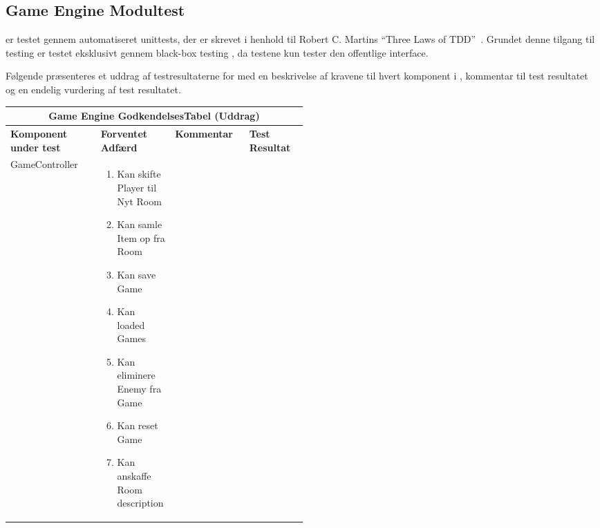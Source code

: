 \subsection{Game Engine Modultest}

\noindent \GE{} er testet gennem automatiseret unittests, der er skrevet i henhold til Robert C. Martins 
``Three Laws of TDD''\ \parencite[Side 122]{CleanCode}. Grundet denne tilgang til testing er \GE{}
testet eksklusivt gennem black-box testing \parencite{BlackBoxLecture}, da testene kun tester den 
offentlige interface.

Følgende præsenteres et uddrag af testresultaterne for \GE{} med en beskrivelse af kravene til hvert 
komponent i \GE{}, kommentar til test resultatet og en endelig vurdering af test resultatet.

\begin{center}
  \begin{longtable}{|l|p{0.25\linewidth}|p{0.25\linewidth}|l|}
    \hline
    \multicolumn{4}{|c|}{\textbf{Game Engine GodkendelsesTabel (Uddrag)}} \\ \hline
    \textbf{Komponent under test} & \textbf{Forventet Adfærd} & \textbf{Kommentar} & \textbf{Test Resultat} \\ \hline
    GameController
    &
    \begin{enumerate}
      \item \begin{flushleft} Kan skifte Player til Nyt Room \end{flushleft}
      \item \begin{flushleft} Kan samle Item op fra Room  \end{flushleft}
      \item \begin{flushleft} Kan save Game \end{flushleft}
      \item \begin{flushleft} Kan loaded Games \end{flushleft}
      \item \begin{flushleft} Kan eliminere Enemy fra Game \end{flushleft}
      \item \begin{flushleft} Kan reset Game \end{flushleft}
      \item \begin{flushleft} Kan anskaffe Room description \end{flushleft}

\end{enumerate}
\end{longtable}
\end{center}
